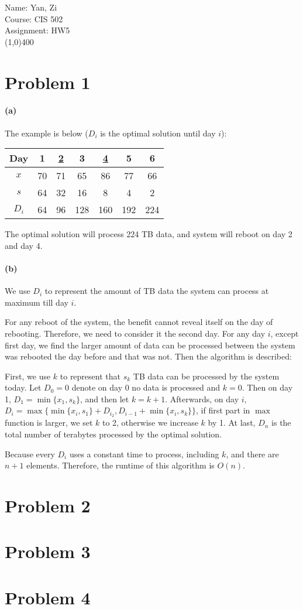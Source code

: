 \documentclass[letter,12pt]{article}
\begin{document}
Name: Yan, Zi \\
Course: CIS 502 \\
Assignment: HW5 \\
\line(1,0){400}

\section*{Problem 1}
\paragraph*{(a)} 
The example is below ($D_i$ is the optimal solution until day $i$):

\begin{tabular}{|c|c|c|c|c|c|c|}
\hline 
Day & 1 & \underline{2} & 3 & \underline{4} & 5 & 6 \\ 
\hline 
$x$ & 70 & 71 & 65 & 86 & 77 & 66 \\ 
\hline 
$s$ & 64 & 32 & 16 & 8 & 4 & 2 \\ 
\hline 
$D_i$ & 64 & 96 & 128 & 160 & 192 & 224 \\ 
\hline 
\end{tabular} 

The optimal solution will process 224 TB data, and system will reboot on day 
2 and day 4.

\paragraph*{(b)}
We use $D_i$ to represent the amount of TB data the system can process at 
maximum till day $i$.

For any reboot of the system, the benefit cannot reveal itself on the day of
rebooting. Therefore, we need to consider it the second day. For any 
day $i$, except first day, we find the larger amount of data can be 
processed between the system was rebooted the day before and that was 
not. Then the algorithm is described:

First, we use $k$ to represent that $s_k$ TB data can be processed by the
system today. Let $D_0 = 0$ denote on day 0 no data is processed and $k 
= 0$. Then on day 1, $D_1 =\min\{x_1, s_k\}$, and then let $k = k+1$.
Afterwards, on day $i$, $D_i = \max\{\min\{x_i, s_1\} + D_{i_2}, D_{i-1} + 
 \min\{x_i, s_k\}\}$, if first part in $\max$ function is larger, we set $k$ to
 2, otherwise we increase $k$ by 1. At last, $D_n$ is the total number of 
 terabytes processed by the optimal solution.
 
 Because every $D_i$ uses a constant time to process, including $k$, and 
 there are $n+1$ elements. Therefore, the runtime of this algorithm is
 $O(n)$.

\section*{Problem 2}

\section*{Problem 3}

\section*{Problem 4}
\end{document}
